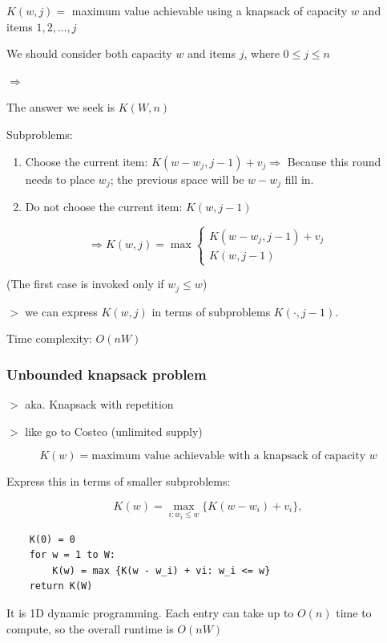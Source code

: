 \documentclass[12pt,a4paper]{article}
\newcommand{\remark}[1]{
    {\small $>$ {\color{blue} #1}}
}
\begin{document}
$K(w, j) =$ maximum value achievable using a knapsack of capacity $w$ and items $1, 2, \dots, j$

We should consider both capacity $w$ and items $j$, where $0 \leq j \leq n$

$\Rightarrow$

The answer we seek is $K(W, n)$

Subproblems:

\begin{enumerate}
    \item Choose the current item: $K(w - w_j, j - 1) + v_j \Rightarrow$ Because this round needs to place $w_j$; the previous space will be $w - w_j$ fill in.
    \item Do not choose the current item: $K(w, j - 1)$
\end{enumerate}

\[
\Rightarrow
K(w, j) = \max \left\{
\begin{array}{l}
    K(w - w_j, j - 1) + v_j \\
    K(w, j - 1)
\end{array}
\right.
\]

\begin{center}
(The first case is invoked only if $w_j \leq w$)
\end{center}

\remark{we can express $K(w, j)$ in terms of subproblems $K(\cdot, j - 1)$.}

Time complexity: $O(nW)$

\subsubsection*{Unbounded knapsack problem}

\remark{aka. Knapsack with repetition}

\remark{like go to Costco (unlimited supply)}

\[K(w) = \text{maximum value achievable with a knapsack of capacity } w\]

Express this in terms of smaller subproblems:

\[
K(w) = \max_{i : w_i \leq w} \{ K(w - w_i) + v_i \},
\]

\begin{verbatim}
    K(0) = 0
    for w = 1 to W:
        K(w) = max {K(w - w_i) + vi: w_i <= w}
    return K(W)
\end{verbatim}

It is 1D dynamic programming. Each entry can take up to $O(n)$ time to compute, so the overall runtime is $O(nW)$ 
\end{document}
